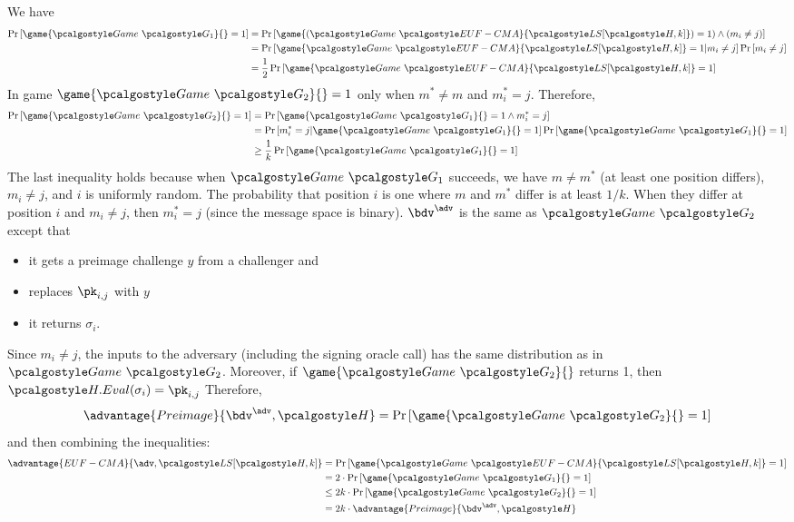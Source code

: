 \ifsolutions
\begin{mysolution}
   We have
  \begin{align*}
      \pr{\game{\Game~\algo{G_1}}{} = 1} &= \pr{\game{(\Game~\algo{EUF-CMA}}{\algo{LS[\algo{H}, k]}}) = 1) \wedge (m_i \neq j)} \\
      &= \pr{\game{\Game~\algo{EUF-CMA}}{\algo{LS[\algo{H}, k]}} = 1 | m_i \neq j} \pr{m_i \neq j} \\
      &= \frac{1}{2}\pr{\game{\Game~\algo{EUF-CMA}}{\algo{LS[\algo{H}, k]}} = 1} \\
  \end{align*}
  In game $\game{\Game~\algo{G_2}}{} = 1$ only when $m^* \neq m$ and $m^*_i = j$.
  Therefore,
  \begin{align*}
      \pr{\game{\Game~\algo{G_2}}{} = 1} &= \pr{\game{\Game~\algo{G_1}}{} = 1 \wedge m^*_i = j} \\
      &= \pr{m^*_i = j | \game{\Game~\algo{G_1}}{} = 1} \pr{\game{\Game~\algo{G_1}}{} = 1} \\
      &\geq \frac{1}{k}\pr{\game{\Game~\algo{G_1}}{} = 1} \\
  \end{align*}
  The last inequality holds because when $\Game~\algo{G_1}$ succeeds, we have $m \neq m^*$ (at least one position differs), $m_i \neq j$, and $i$ is uniformly random. The probability that position $i$ is one where $m$ and $m^*$ differ is at least $1/k$. When they differ at position $i$ and $m_i \neq j$, then $m^*_i = j$ (since the message space is binary).
  $\bdv^\adv$ is the same as $\Game~\algo{G_2}$ except that
  \begin{itemize}
      \item it gets a preimage challenge $y$ from a challenger and
      \item replaces $\pk_{i, j}$ with $y$
      \item it returns $\sigma_i$.
  \end{itemize}
  Since $m_i \neq j$, the inputs to the adversary (including the signing oracle call) has the same distribution as in $\Game~\algo{G_2}$.
  Moreover, if $\game{\Game~\algo{G_2}}{}$ returns 1, then $\algo{H.Eval}(\sigma_i) = \pk_{i, j}$
  Therefore,
  \[
  \advantage{Preimage}{\bdv^\adv, \algo{H}} = \pr{\game{\Game~\algo{G_2}}{} = 1}
  \]
  and then combining the inequalities:
  \begin{align*}
    \advantage{EUF-CMA}{\adv, \algo{LS}[\algo{H, k}]} &= \pr{\game{\Game~\algo{EUF-CMA}}{\algo{LS[\algo{H}, k]}} = 1} \\
    &= 2 \cdot \pr{\game{\Game~\algo{G_1}}{} = 1} \\
    &\leq 2k \cdot \pr{\game{\Game~\algo{G_2}}{} = 1} \\
    &= 2k \cdot \advantage{Preimage}{\bdv^\adv, \algo{H}}
  \end{align*}
\end{mysolution}
\fi

